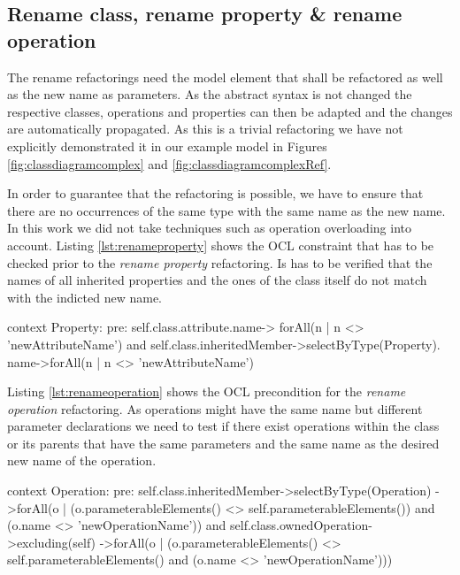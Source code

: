 \documentclass{llncs}
\begin{document}
\subsection{Rename class, rename property \& rename operation}
\label{sec:renames}
The rename refactorings need the model element that shall be refactored as well as the new name as parameters. As the abstract syntax 
is not changed the respective classes, operations and properties can then be adapted 
and the changes are automatically propagated. As this is a trivial refactoring we have not explicitly demonstrated it in our example model 
in Figures \ref{fig:classdiagramcomplex} and \ref{fig:classdiagramcomplexRef}. 

In order to guarantee that the 
refactoring is possible, we have to ensure that there are no occurrences of the same type with the same name as the 
new name. In this work we did not take techniques such as operation overloading into account. Listing \ref{lst:renameproperty} shows the 
OCL constraint that has to be checked prior to the \textit{rename property} 
refactoring. Is has to be verified that the names of all inherited properties and the ones of the class itself do not match 
with the indicted new name.

\begin{lstsingle}[language=OCL,caption=OCL for \textit{rename property} refactoring,label=lst:renameproperty]
context Property:
pre:  self.class.attribute.name->
        forAll(n | n <> 'newAttributeName') 
      and 
      self.class.inheritedMember->selectByType(Property).
        name->forAll(n | n <> 'newAttributeName')
\end{lstsingle}

Listing \ref{lst:renameoperation} shows the OCL precondition for the \textit{rename operation} refactoring. As operations 
might have the same name but different parameter declarations we need to test if there exist operations within the 
class or its parents that have the same parameters and the same name as the desired new name of the operation.

\begin{lstsingle}[language=OCL,caption=OCL for \textit{rename operation} refactoring,label=lst:renameoperation]
context Operation:
pre:  self.class.inheritedMember->selectByType(Operation)
        ->forAll(o | (o.parameterableElements() <> 
          self.parameterableElements()) 
          and (o.name <> 'newOperationName')) 
      and 
      self.class.ownedOperation->excluding(self)
        ->forAll(o | (o.parameterableElements() <> 
          self.parameterableElements() 
          and (o.name <> 'newOperationName')))
\end{lstsingle}
\end{document}
